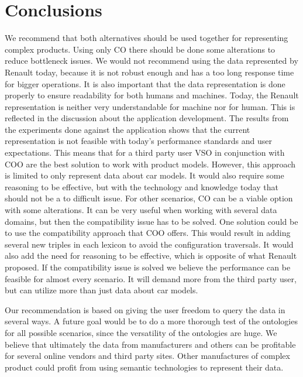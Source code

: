 \documentclass{llncs}
\begin{document}
\section{Conclusions}

We recommend that both alternatives should be used together for
representing complex products. 
Using only CO there should be done some alterations to reduce
bottleneck issues. We would not recommend using the data represented
by Renault today, because it is not robust enough and has a too long
response time for bigger operations.  It is also important that the
data representation is done properly to ensure readability for both
humans and machines.  Today, the Renault representation is neither
very understandable for machine nor for human. This is reflected in
the discussion about the application development.  The results from
the experiments done against the application shows that the current
representation is not feasible with today's performance standards and
user expectations. This means that for a third party user VSO
in conjunction with COO are the best solution to work with product
models. However, this approach is limited to only represent data about
car models. It would also require some reasoning to be effective, but
with the technology and knowledge today that should not be a to
difficult issue. For other scenarios, CO can be a viable option with 
some alterations. It can be very useful when working with several
data domains, but then the compatibility issue has to be solved.  One
solution could be to use the compatibility approach that COO
offers. This would result in adding several new triples in each
lexicon to avoid the configuration traversals.  It would also add the
need for reasoning to be effective, which is opposite of what Renault
proposed. If the compatibility issue is solved we believe the
performance can be feasible for almost every scenario. It will demand
more from the third party user, but can utilize more than just data
about car models. 

Our recommendation is based on giving the user freedom to query the
data in several ways.  A future goal would be to do a more thorough
test of the ontologies for all possible scenarios, since the
versatility of the ontologies are huge. We believe that ultimately the
data from manufacturers and others can be profitable for several
online vendors and third party sites. Other manufactures of complex
product could profit from using semantic
technologies to represent their data.
\end{document}
